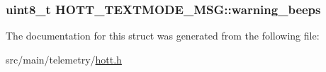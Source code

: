 \hypertarget{structHOTT__TEXTMODE__MSG_abf553e7ad0aedcc9f8311b5555f54b3b}{
\subsubsection[{warning\+\_\+beeps}]{\setlength{\rightskip}{0pt plus 5cm}uint8\+\_\+t H\+O\+T\+T\+\_\+\+T\+E\+X\+T\+M\+O\+D\+E\+\_\+\+M\+S\+G\+::warning\+\_\+beeps}}\label{structHOTT__TEXTMODE__MSG_abf553e7ad0aedcc9f8311b5555f54b3b}


The documentation for this struct was generated from the following file\+:\begin{DoxyCompactItemize}
\item 
src/main/telemetry/\hyperlink{telemetry_2hott_8h}{hott.\+h}\end{DoxyCompactItemize}
